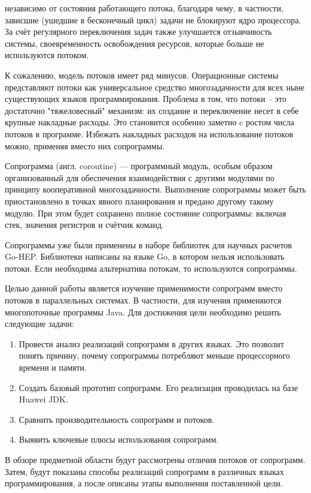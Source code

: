 	независимо от состояния работающего потока, благодаря чему, в частности, зависшие (ушедшие в бесконечный цикл)
	задачи не блокируют ядро процессора. За счёт регулярного переключения задач 
	также улучшается отзывчивость системы, своевременность освобождения ресурсов, которые больше
	не используются потоком\cite{real-time-lang}.
	\par
	К сожалению, модель потоков имеет ряд минусов. 
	Операционные системы представляют потоки как универсальное средство многозадачности
	для всех ныне существующих языков программирования. Проблема в том, что потоки 
	-- это достаточно "тяжеловесный" механизм: их создание и переключение несет в себе крупные накладные расходы. 
	Это становится особенно заметно c ростом числа потоков в программе.  
	Избежать накладных расходов на использование потоков можно, применяя вместо них сопрограммы. 
	\par
	Сопрограмма (англ. coroutine) — программный модуль, особым образом организованный для обеспечения взаимодействия с
	другими модулями по принципу кооперативной многозадачности\cite{coroutine}. Выполнение сопрограммы может быть
	приостановлено в точках явного планирования и предано другому такому модулю. При этом будет сохранено полное
	состояние сопрограммы: включая стек, значения регистров и счётчик команд. 
	\par
	Сопрограммы уже были применены в наборе библиотек для научных расчетов Go-HEP\cite{go-hep}.
	Библиотеки написаны на языке Go, в котором нельзя использовать потоки. Если необходима 
	альтернатива потокам, то используются сопрограммы. 
	\par
	Целью данной работы является изучение применимости сопрограмм вместо потоков в параллельных системах. 
	В частности, для изучения применяются многопоточные программы Java. Для достижения цели необходимо решить
	следующие задачи:
	\begin{enumerate}[align=left]
		\item Провести анализ реализаций сопрограмм в других языках. Это позволит понять причину, почему 
		сопрограммы потребляют меньше процессорного времени и памяти.
		\item Создать базовый прототип сопрограмм. Его реализация проводилась на базе Huawei JDK.
		\item Сравнить производительность сопрограмм и потоков.
		\item Выявить ключевые плюсы использования сопрограмм.
	\end{enumerate}
	В обзоре предметной области будут рассмотрены отличия потоков от сопрограмм. 
	Затем, будут показаны способы реализаций сопрограмм в
	различных языках программирования, а после описаны этапы выполнения поставленной цели.
\clearpage